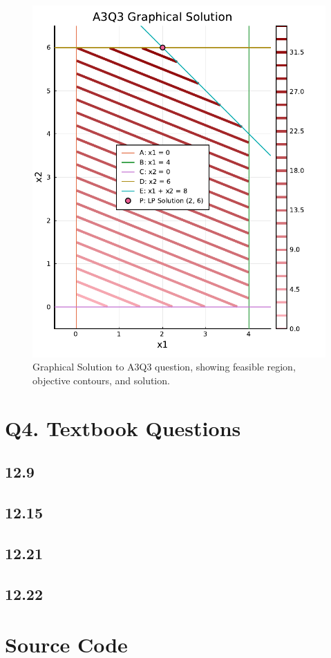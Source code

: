 \documentclass{article}
\begin{document}
    \begin{figure}[H]
        \centering
        \includegraphics[width=0.5\linewidth]{A3Q3_Plot.pdf}
        \caption{Graphical Solution to A3Q3 question, showing feasible region, objective contours, and solution.}
        \label{fig:A3Q3_GraphicalSolution}
    \end{figure}

    \section{Q4. Textbook Questions}

    \subsection{12.9}

    \subsection{12.15}

    \subsection{12.21}

    \subsection{12.22}


    \newpage
    \appendix

    \section{Source Code}
\end{document}
